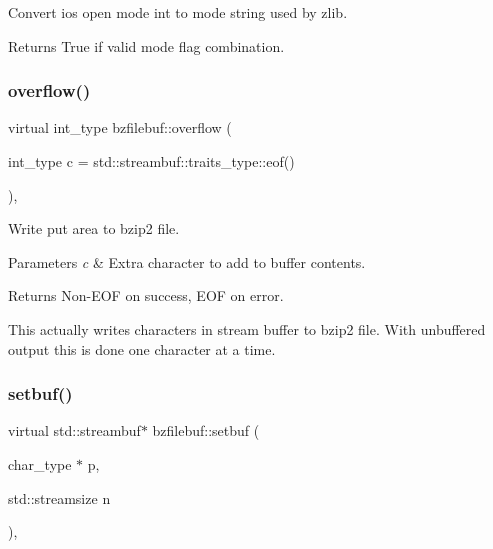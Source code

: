 Convert ios open mode int to mode string used by zlib. 

\begin{DoxyReturn}{Returns}
True if valid mode flag combination. 
\end{DoxyReturn}
\mbox{\label{classbzfilebuf_aac23c07f79d6c8ba4406d01e3bf4cf56}} 
\subsubsection{\texorpdfstring{overflow()}{overflow()}}
{\footnotesize\ttfamily virtual int\+\_\+type bzfilebuf\+::overflow (\begin{DoxyParamCaption}\item[{int\+\_\+type}]{c = {\ttfamily std\+:\+:streambuf\+:\+:traits\+\_\+type\+:\+:eof()} }\end{DoxyParamCaption})\hspace{0.3cm}{\ttfamily [protected]}, {\ttfamily [virtual]}}



Write put area to bzip2 file. 


\begin{DoxyParams}{Parameters}
{\em c} & Extra character to add to buffer contents. \\
\hline
\end{DoxyParams}
\begin{DoxyReturn}{Returns}
Non-\/\+E\+OF on success, E\+OF on error.
\end{DoxyReturn}
This actually writes characters in stream buffer to bzip2 file. With unbuffered output this is done one character at a time. \mbox{\label{classbzfilebuf_a0969887ed38fdcdcfc5817b2c5b6a711}} 
\subsubsection{\texorpdfstring{setbuf()}{setbuf()}}
{\footnotesize\ttfamily virtual std\+::streambuf$\ast$ bzfilebuf\+::setbuf (\begin{DoxyParamCaption}\item[{char\+\_\+type $\ast$}]{p,  }\item[{std\+::streamsize}]{n }\end{DoxyParamCaption})\hspace{0.3cm}{\ttfamily [protected]}, {\ttfamily [virtual]}}



